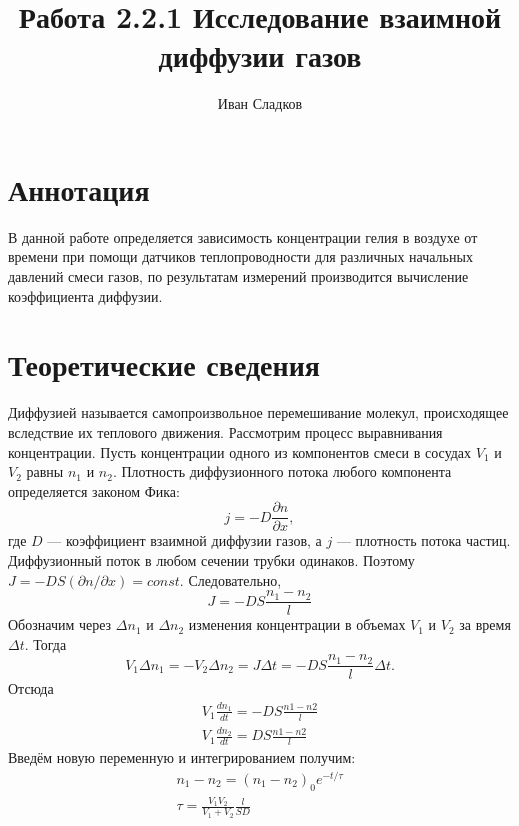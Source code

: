 \documentclass[a4paper]{article}
\title{Работа 2.2.1 Исследование взаимной диффузии газов}
\author{Иван Сладков}
\begin{document}
\maketitle
\thispagestyle{empty}
\section{Аннотация}
В данной работе определяется зависимость концентрации гелия в воздухе от времени при помощи датчиков теплопроводности для различных начальных давлений смеси газов, по результатам измерений производится вычисление коэффициента диффузии.
\section{Теоретические сведения}
Диффузией называется самопроизвольное перемешивание молекул, происходящее вследствие их теплового движения. Рассмотрим процесс выравнивания концентрации. Пусть концентрации одного из компонентов смеси в сосудах $V_1$ и $V_2$ равны $n_1$ и $n_2$. Плотность диффузионного потока любого компонента определяется законом Фика:
\begin{equation}
j = -D \frac{\partial n}{\partial x},
\label{eq:Fik}
\end{equation}
где $D$ — коэффициент взаимной диффузии газов, а $j$ — плотность потока частиц. Диффузионный поток в любом сечении трубки одинаков. Поэтому $J = -D S (\partial n / \partial x) = const$. Следовательно,
\begin{equation}
J = -D S \frac{n_1 - n_2}{l}
\label{eq:current}
\end{equation}
Обозначим через $\Delta n_1$ и $\Delta n_2$ изменения концентрации в объемах $V_1$ и $V_2$ за время $\Delta t$. Тогда
\begin{equation}
V_1 \Delta n_1 = -V_2 \Delta n_2 = J \Delta t = -D S \frac{n_1 - n_2}{l} \Delta t.
\end{equation}
Отсюда
\begin{eqnarray}
V_1 \frac{dn_1}{dt} = -DS \frac{n1 - n2}{l} \\ 
V_1 \frac{dn_2}{dt} = DS \frac{n1 - n2}{l}
\end{eqnarray}
Введём новую переменную и интегрированием получим:
\begin{eqnarray}
\label{eq:n}
n_1 - n_2 = (n_1 - n_2)_0 e^{-t/\tau} \\
\tau = \frac{V_1 V_2}{V_1 + V_2} \frac{l}{S D}
\label{eq:tau}
\end{eqnarray}
\end{document}
